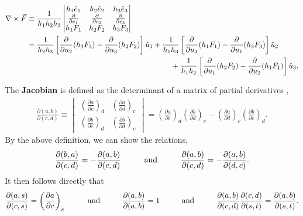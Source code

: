 \begin{align}
	\nabla \times \vec{F} &\equiv \frac{1}{h_1h_2h_3}
	\begin{vmatrix}
		h_1\hat{e}_1 & h_2\hat{e}_2 & h_3\hat{e}_3  \\ 
		\frac{\partial}{\partial e_1} & \frac{\partial}{\partial e_2} & \frac{\partial}{\partial e_3}  \\ 
		h_1F_1 & h_2F_2 & h_3F_3  
	\end{vmatrix} \\
	&= \frac{1}{h_2h_3}\left[\frac{\partial}{\partial u_2}(h_3F_3)-\frac{\partial}{\partial u_3}(h_2F_2)\right]\hat{u}_1+\frac{1}{h_1h_3}\left[\frac{\partial}{\partial u_3}(h_1F_1)-\frac{\partial}{\partial u_1}(h_3F_3)\right]\hat{u}_2 \nonumber\\
	&\hspace{6.72cm}+\frac{1}{h_1h_2}\left[\frac{\partial}{\partial u_1}(h_2F_2)-\frac{\partial}{\partial u_2}(h_1F_1)\right]\hat{u}_3.
\end{align} 

The \textbf{Jacobian} is defined as the determinant of a matrix of partial derivatives \cite{bib:StellarAstrophysics},
\begin{align}
	\frac{\partial(a,b)}{\partial(c,d)} \equiv \begin{vmatrix}
		\left(\frac{\partial a}{\partial c}\right)_d & \left(\frac{\partial a}{\partial d}\right)_c \\
		\left(\frac{\partial b}{\partial c}\right)_d & \left(\frac{\partial b}{\partial d}\right)_c
	\end{vmatrix} =\left(\frac{\partial a}{\partial c}\right)_d\left(\frac{\partial b}{\partial d}\right)_c - \left(\frac{\partial a}{\partial d}\right)_c\left(\frac{\partial b}{\partial c}\right)_d.
\end{align}
By the above definition, we can show the relations,
\begin{align}
	\frac{\partial(b,a)}{\partial(c,d)}=-\frac{\partial(a,b)}{\partial(c,d)} \andspace{1cm} \frac{\partial(a,b)}{\partial(c,d)}=-\frac{\partial(a,b)}{\partial(d,c)}.
\end{align}
It then follows directly that
\begin{align}
	\frac{\partial(a,s)}{\partial(c,s)} = \left(\frac{\partial a}{\partial c}\right)_s \andspace{1cm} \frac{\partial(a,b)}{\partial(a,b)} = 1 \andspace{1cm} \frac{\partial(a,b)}{\partial(c,d)}\frac{\partial(c,d)}{\partial(s,t)} = \frac{\partial(a,b)}{\partial(s,t)}.
\end{align}